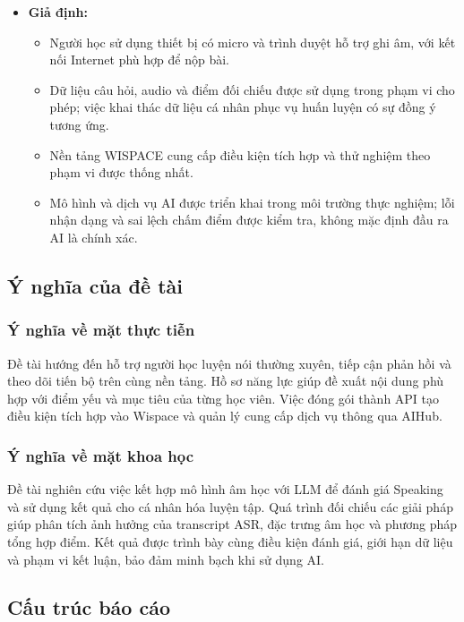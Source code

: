 \begin{itemize}
    \item \textbf{Giả định:}
    \begin{itemize}
        \item Người học sử dụng thiết bị có micro và trình duyệt hỗ trợ ghi âm, với kết nối Internet phù hợp để nộp bài.
        \item Dữ liệu câu hỏi, audio và điểm đối chiếu được sử dụng trong phạm vi cho phép; việc khai thác dữ liệu cá nhân phục vụ huấn luyện có sự đồng ý tương ứng.
        \item Nền tảng WISPACE cung cấp điều kiện tích hợp và thử nghiệm theo phạm vi được thống nhất.
        \item Mô hình và dịch vụ AI được triển khai trong môi trường thực nghiệm; lỗi nhận dạng và sai lệch chấm điểm được kiểm tra, không mặc định đầu ra AI là chính xác.
    \end{itemize}
\end{itemize}

\subsection{Ý nghĩa của đề tài}
\subsubsection{Ý nghĩa về mặt thực tiễn}
\indent Đề tài hướng đến hỗ trợ người học luyện nói thường xuyên, tiếp cận phản hồi và theo dõi tiến bộ trên cùng nền tảng. Hồ sơ năng lực giúp đề xuất nội dung phù hợp với điểm yếu và mục tiêu của từng học viên. Việc đóng gói thành API tạo điều kiện tích hợp vào Wispace và quản lý cung cấp dịch vụ thông qua AIHub.

\subsubsection{Ý nghĩa về mặt khoa học}
\indent Đề tài nghiên cứu việc kết hợp mô hình âm học với LLM để đánh giá Speaking và sử dụng kết quả cho cá nhân hóa luyện tập. Quá trình đối chiếu các giải pháp giúp phân tích ảnh hưởng của transcript ASR, đặc trưng âm học và phương pháp tổng hợp điểm. Kết quả được trình bày cùng điều kiện đánh giá, giới hạn dữ liệu và phạm vi kết luận, bảo đảm minh bạch khi sử dụng AI.

\subsection{Cấu trúc báo cáo}

